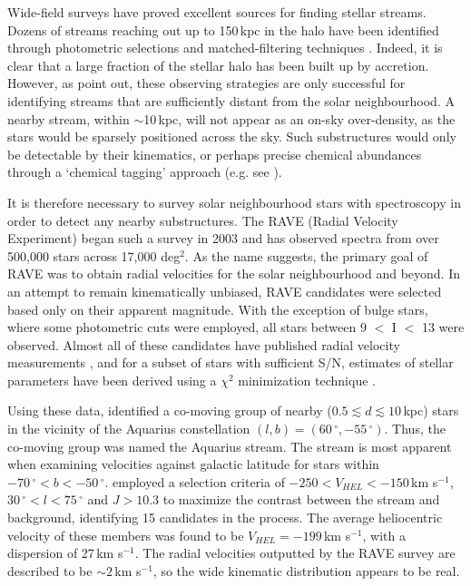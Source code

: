 \documentclass{emulateapj}
\begin{document}
Wide-field surveys have proved excellent sources for finding stellar streams. Dozens of streams reaching out up to 150\,kpc in the halo have been identified through photometric selections and matched-filtering techniques \citep{belokurov;et-al_2007,koposov_SG1}. Indeed, it is clear that a large fraction of the stellar halo has been built up by accretion. However, as \citet{helmi;white_1999} point out, these observing strategies are only successful for identifying streams that are sufficiently distant from the solar neighbourhood. A nearby stream, within $\sim{}$10\,kpc, will not appear as an on-sky over-density, as the stars would be sparsely positioned across the sky. Such substructures would only be detectable by their kinematics, or perhaps precise chemical abundances through a `chemical tagging' approach (e.g. see \citet{freeman;bland-hawthorn_2003}). 

It is therefore necessary to survey solar neighbourhood stars with spectroscopy in order to detect any nearby substructures. The RAVE (Radial Velocity Experiment) began such a survey in 2003 and has observed spectra from over 500,000 stars across 17,000 deg$^{2}$. As the name suggests, the primary goal of RAVE was to obtain radial velocities for the solar neighbourhood and beyond. In an attempt to remain kinematically unbiased, RAVE candidates were selected based only on their apparent magnitude. With the exception of bulge stars, where some photometric cuts were employed, all stars between 9 $<$ I $<$ 13 were observed. Almost all of these candidates have published radial velocity measurements \citep{steinmetz;et-al_2006}, and for a subset of stars with sufficient S/N, estimates of stellar parameters have been derived using a $\chi^2$ minimization technique \citep{zwitter;et-al_2008, siebert;et-al_2011}. 

Using these data, \citet{williams;et-al_2011} identified a co-moving group of nearby ($0.5 \lesssim d \lesssim 10$\,kpc) stars in the vicinity of the Aquarius constellation $(l, b) = (60\,^\circ, -55\,^\circ)$. Thus, the co-moving group was named the Aquarius stream. The stream is most apparent when examining velocities against galactic latitude for stars within $-70\,^\circ < b < -50\,^\circ$. \citet{williams;et-al_2011} employed a selection criteria of $-250 < V_{HEL} < -150$\,km s$^{-1}$, $30\,^\circ < l < 75\,^\circ$ and $J > 10.3$ to maximize the contrast between the stream and background, identifying 15 candidates in the process. The average heliocentric velocity of these members was found to be $V_{HEL} = -199$\,km s$^{-1}$, with a dispersion of 27\,km s$^{-1}$. The radial velocities outputted by the RAVE survey are described to be $\sim2$\,km s$^{-1}$, so the wide kinematic distribution appears to be real.
\end{document}
